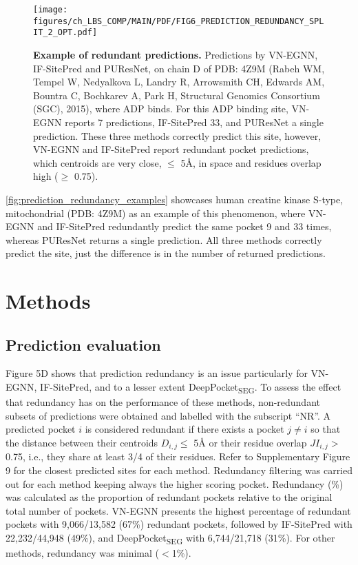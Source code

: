 \begin{figure}[htb!]
    \centering
    \texttt{[image: figures/ch\_LBS\_COMP/MAIN/PDF/FIG6\_PREDICTION\_REDUNDANCY\_SPLIT\_2\_OPT.pdf]}
    \caption[Example of redundant predictions]{\textbf{Example of redundant predictions.} Predictions by VN-EGNN, IF-SitePred and PUResNet, on chain D of PDB: 4Z9M (Rabeh WM, Tempel W, Nedyalkova L, Landry R, Arrowsmith CH, Edwards AM, Bountra C, Bochkarev A, Park H, Structural Genomics Consortium (SGC), 2015), where ADP binds. For this ADP binding site, VN-EGNN reports 7 predictions, IF-SitePred 33, and PUResNet a single prediction. These three methods correctly predict this site, however, VN-EGNN and IF-SitePred report redundant pocket predictions, which centroids are very close, $\leq$ 5\AA{}, in space and residues overlap high ($\geq$ 0.75).}
    \label{fig:prediction_redundancy_examples}
\end{figure}

\autoref{fig:prediction_redundancy_examples} showcases human creatine kinase S-type, mitochondrial (PDB: 4Z9M) as an example of this phenomenon, where VN-EGNN and IF-SitePred redundantly predict the same pocket 9 and 33 times, whereas PUResNet returns a single prediction. All three methods correctly predict the site, just the difference is in the number of returned predictions.

\section{Methods}

\subsection{Prediction evaluation}

Figure 5D shows that prediction redundancy is an issue particularly for VN-EGNN, IF-SitePred, and to a lesser extent DeepPocket\textsubscript{SEG}. To assess the effect that redundancy has on the performance of these methods, non-redundant subsets of predictions were obtained and labelled with the subscript ``NR''. A predicted pocket $i$ is considered redundant if there exists a pocket $j \neq i$ so that the distance between their centroids $D_{i,j} \leq$ 5\AA{} or their residue overlap $JI_{i,j} >$ 0.75, i.e., they share at least 3/4 of their residues. Refer to Supplementary Figure 9 for the closest predicted sites for each method. Redundancy filtering was carried out for each method keeping always the higher scoring pocket. Redundancy (\%) was calculated as the proportion of redundant pockets relative to the original total number of pockets. VN-EGNN presents the highest percentage of redundant pockets with 9,066/13,582 (67\%) redundant pockets, followed by IF-SitePred with 22,232/44,948 (49\%), and DeepPocket\textsubscript{SEG} with 6,744/21,718 (31\%). For other methods, redundancy was minimal ($<$1\%).

